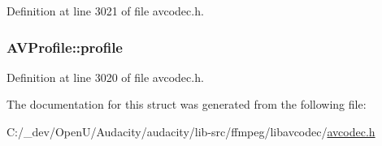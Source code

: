 Definition at line 3021 of file avcodec.\+h.

\subsubsection[{\texorpdfstring{profile}{profile}}]{ A\+V\+Profile\+::profile}\hypertarget{struct_a_v_profile_a3f7b83013dedfe74c8886eed84b65795}{}\label{struct_a_v_profile_a3f7b83013dedfe74c8886eed84b65795}


Definition at line 3020 of file avcodec.\+h.



The documentation for this struct was generated from the following file\+:\begin{DoxyCompactItemize}
\item 
C\+:/\+\_\+dev/\+Open\+U/\+Audacity/audacity/lib-\/src/ffmpeg/libavcodec/\hyperlink{avcodec_8h}{avcodec.\+h}\end{DoxyCompactItemize}
